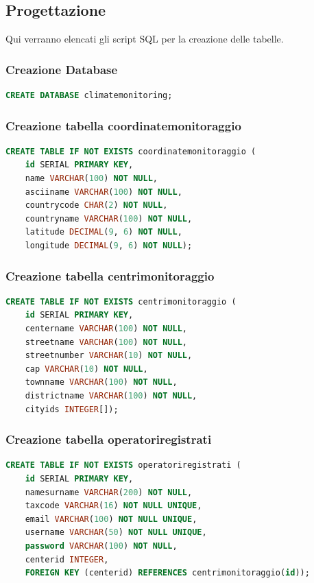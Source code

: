 \subsection{Progettazione}
Qui verranno elencati gli script SQL per la creazione delle tabelle.

\subsubsection{Creazione Database}
\begin{lstlisting}[language=SQL]
CREATE DATABASE climatemonitoring;
\end{lstlisting}

\subsubsection{Creazione tabella coordinatemonitoraggio}
\begin{lstlisting}[language=SQL]
    CREATE TABLE IF NOT EXISTS coordinatemonitoraggio (
    id SERIAL PRIMARY KEY,
    name VARCHAR(100) NOT NULL,
    asciiname VARCHAR(100) NOT NULL,
    countrycode CHAR(2) NOT NULL,
    countryname VARCHAR(100) NOT NULL,
    latitude DECIMAL(9, 6) NOT NULL, 
    longitude DECIMAL(9, 6) NOT NULL);
\end{lstlisting}

\subsubsection{Creazione tabella centrimonitoraggio}
\begin{lstlisting}[language=SQL]
    CREATE TABLE IF NOT EXISTS centrimonitoraggio (
    id SERIAL PRIMARY KEY,
    centername VARCHAR(100) NOT NULL,
    streetname VARCHAR(100) NOT NULL,
    streetnumber VARCHAR(10) NOT NULL,
    cap VARCHAR(10) NOT NULL,
    townname VARCHAR(100) NOT NULL, 
    districtname VARCHAR(100) NOT NULL,
    cityids INTEGER[]);
\end{lstlisting}

\subsubsection{Creazione tabella operatoriregistrati}
\begin{lstlisting}[language=SQL]
    CREATE TABLE IF NOT EXISTS operatoriregistrati (
    id SERIAL PRIMARY KEY, 
    namesurname VARCHAR(200) NOT NULL, 
    taxcode VARCHAR(16) NOT NULL UNIQUE, 
    email VARCHAR(100) NOT NULL UNIQUE,
    username VARCHAR(50) NOT NULL UNIQUE,
    password VARCHAR(100) NOT NULL,
    centerid INTEGER, 
    FOREIGN KEY (centerid) REFERENCES centrimonitoraggio(id));
\end{lstlisting}

